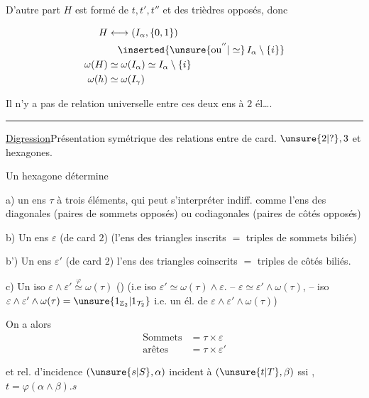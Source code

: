 
D'autre part $H$ est formé de $t,t',t''$ et des trièdres opposés, donc

\[
\begin{aligned}
H&\longleftrightarrow(I_\alpha,\{0,1\})\\
&\quad\inserted{\unsure{\text{ou}^{''}|\simeq}\,I_\alpha\setminus\{i\}}\\
\omega(H)&\simeq\omega(I_\alpha)\simeq I_\alpha\setminus\{i\}\\
\omega(h)&\simeq\omega(I_\gamma)
\end{aligned}
\]

Il n'y a pas de relation universelle entre ces deux ens à $2$ él\ldots.

\noindent\rule{1.3cm}{.35pt}\par
{}\quad\uline{Digression}\quad Présentation symétrique des relations entre   de card. $\unsure{2|?},3$ et hexagones.

Un hexagone détermine

a) un ens $\tau$ à trois éléments, qui peut s'interpréter indiff. comme l'ens des diagonales (paires de sommets opposés) ou codiagonales (paires de côtés opposés)

b) Un ens $\varepsilon$ (de card $2$)  (l'ens des triangles inscrits $=$ triples de sommets biliés)

b') Un ens $\varepsilon'$ (de card $2$) l'ens des triangles coinscrits $=$ triples de côtés biliés.

c) Un iso $\varepsilon\wedge\varepsilon'\overset{\varphi}{\simeq}\omega(\tau)$ ()  (i.e iso $\varepsilon'\simeq\omega(\tau)\wedge\varepsilon$. -- $\varepsilon\simeq\varepsilon'\wedge\omega(\tau)$, -- iso $\varepsilon\wedge\varepsilon'\wedge\omega(\tau)=\unsure{1_{\mathbb Z_2}|1_{\mathcal T_2}}$ i.e. un él. de $\varepsilon\wedge\varepsilon'\wedge\omega(\tau)$)

On a alors
\[
\begin{aligned}
\text{Sommets}&=\tau\times\varepsilon\\
\text{arêtes}&=\tau\times\varepsilon'
\end{aligned}
\]

et rel. d'incidence $(\unsure{s|S},\alpha)$ incident à $(\unsure{t|T},\beta)$ ssi , $t=\varphi(\alpha\wedge\beta).s$

